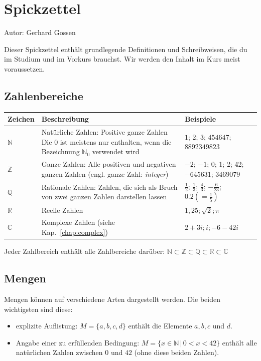 
\chapter{Spickzettel}

Autor: Gerhard Gossen

Dieser \glqq Spickzettel\grqq{} enthält grundlegende Definitionen und
Schreibweisen, die du im Studium und im Vorkurs brauchst. Wir werden den Inhalt im Kurs
meist voraussetzen.

\section{Zahlenbereiche}
{
\begin{tabular}{lp{18em}p{7em}}
 \textbf{Zeichen} & \textbf{Beschreibung} & \textbf{Beispiele}\\
\hline 
$\mathbb{N}$ & Natürliche Zahlen: Positive ganze Zahlen Die $0$ ist
 meistens  nur enthalten, wenn die Bezeichnung $\mathbb{N}_0$ verwendet
  wird
 & $1$; $2$;
$3$; $454647$; $8892349823$\\
$\mathbb{Z}$ & Ganze Zahlen: Alle positiven und negativen ganzen Zahlen (engl.
ganze Zahl: \emph{integer}) &
$-2$; $-1$; 0; 1; 2; 42; $-645631$; $3469079$ \\
$\mathbb{Q}$ & Rationale Zahlen: Zahlen, die sich als Bruch von zwei ganzen Zahlen darstellen lassen &
$\frac{1}{2}$; $\frac{1}{3}$; $\frac{4}{3}$; $-\frac{6}{23}$; $0.2 (=\frac{1}{5})$  \\
$\mathbb{R}$ & Reelle Zahlen & $1,25; \sqrt{2}; \pi$\\
$\mathbb{C}$ & Komplexe Zahlen (siehe Kap.~\ref{chap:complex}) & $2 + 3i; i;
-6 - 42i$
\end{tabular}
}

\vspace{1em}
Jeder Zahlbereich enthält alle Zahlbereiche darüber:
$\mathbb{N} \subset \mathbb{Z} \subset \mathbb{Q} \subset \mathbb{R} \subset \mathbb{C}$

\section{Mengen}
Mengen können auf verschiedene Arten dargestellt werden. Die beiden 
wichtigsten sind diese:
\begin{itemize}
 \item explizite Auflistung: $M = \{a, b, c, d\}$ enthält die Elemente $a, b, c$ und $d$.
 \item Angabe einer zu erfüllenden Bedingung: $M = \{x \in \mathbb{N}\, |\, 0 < x < 42 \}$ 
    enthält alle natürlichen Zahlen zwischen $0$ und $42$ (ohne diese beiden Zahlen).
\end{itemize}

